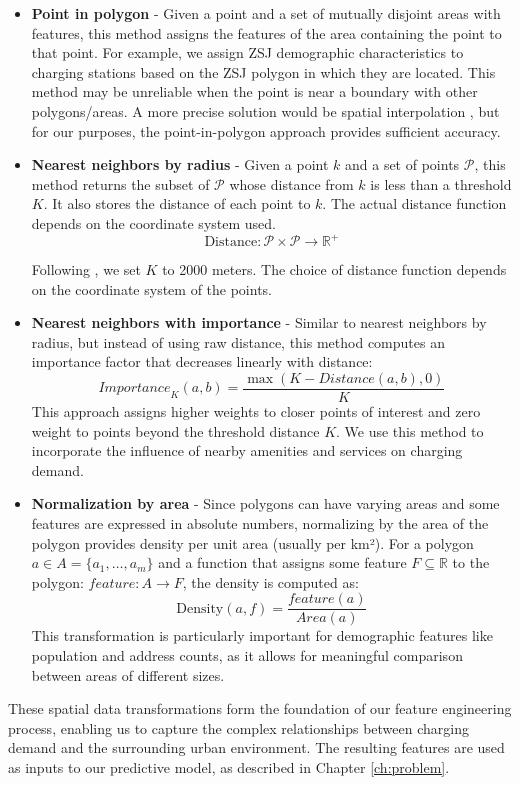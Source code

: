 \begin{itemize}
    \item[] \textbf{Point in polygon} - Given a point and a set of mutually disjoint areas with features, this method assigns the features of the area containing the point to that point. For example, we assign ZSJ demographic characteristics to charging stations based on the ZSJ polygon in which they are located. This method may be unreliable when the point is near a boundary with other polygons/areas. A more precise solution would be spatial interpolation , but for our purposes, the point-in-polygon approach provides sufficient accuracy.

    \item[] \textbf{Nearest neighbors by radius} - Given a point $k$ and a set of points $\mathcal{P}$, this method returns the subset of $\mathcal{P}$ whose distance from $k$ is less than a threshold $K$. It also stores the distance of each point to $k$. The actual distance function depends on the coordinate system used.
          \[ \text{Distance}: \mathcal{P} \times \mathcal{P} \rightarrow \mathbb{R}^+  \]

          Following , we set $K$ to 2000 meters. The choice of distance function depends on the coordinate system of the points.

    \item[] \textbf{Nearest neighbors with importance}  - Similar to nearest neighbors by radius, but instead of using raw distance, this method computes an importance factor that decreases linearly with distance:
          \[
              \textit{Importance}_K(a,b) = \frac{\max(K - \textit{Distance}(a,b), 0)}{K}
          \]
          This approach assigns higher weights to closer points of interest and zero weight to points beyond the threshold distance $K$. We use this method to incorporate the influence of nearby amenities and services on charging demand.

    \item[] \textbf{Normalization by area} - Since polygons can have varying areas and some features are expressed in absolute numbers, normalizing by the area of the polygon provides density per unit area (usually per km²). For a polygon $a \in A = \{a_1, \dots, a_m\}$ and a function that assigns some feature $F \subseteq \mathbb{R}$ to the polygon: $\textit{feature}: A \rightarrow F$, the density is computed as:
          \[ \text{Density}(a,f) = \frac{\textit{feature}(a)}{\textit{Area}(a)} \]
          This transformation is particularly important for demographic features like population and address counts, as it allows for meaningful comparison between areas of different sizes.
\end{itemize}

These spatial data transformations form the foundation of our feature engineering process, enabling us to capture the complex relationships between charging demand and the surrounding urban environment. The resulting features are used as inputs to our predictive model, as described in Chapter \ref{ch:problem}.
